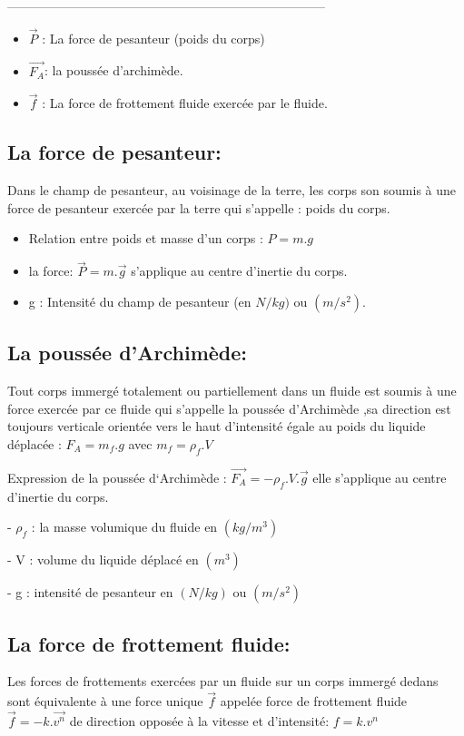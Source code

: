 \documentclass[12pt]{article}
\begin{document}
---------------------------------------------------------------------------
\begin{itemize}
	\item $\vec{P}$ : La force de pesanteur (poids du corps)
	\item $\vec{F_A}$: la poussée d'archimède.
	\item $\vec{f}$ : La force de frottement fluide exercée par le fluide. 
\end{itemize}

\subsection{La force de pesanteur: }
Dans le champ de pesanteur, au voisinage de la terre, les corps son soumis à une force de pesanteur exercée par la terre qui s'appelle : poids du corps.

\begin{itemize}
	\item Relation entre poids et masse d’un corps : $P = m.g$
		\item la force: $\vec{P} = m.\vec{g}$ s'applique au centre d'inertie du corps.

		\item g : Intensité du champ de pesanteur (en $ N/kg)$ ou $(m/s^2)$.

\end{itemize}
\subsection{La poussée d'Archimède:}
Tout corps immergé totalement ou partiellement dans un fluide est soumis à une force exercée par ce fluide qui
s'appelle la poussée d'Archimède ,sa direction est toujours verticale orientée vers le haut d'intensité égale au poids
du liquide déplacée : $F_A = m_f.g$ avec $m_f = \rho_f.V$

Expression de la poussée d‘Archimède : $\vec{F_A} = - \rho_f.V.\vec{g}$ elle s'applique au centre d'inertie du corps.

- $\rho_f$ : la masse volumique du fluide en $(kg/m^3)$

- V :  volume du liquide déplacé en $(m^3)$

- g : intensité de pesanteur en $(N/kg)$ ou $(m/s^2)$

\subsection{La force de frottement fluide:}
Les forces de frottements exercées par un fluide sur un corps immergé dedans sont équivalente à une force unique $\vec{f}$ appelée force de frottement fluide $\vec{f} = -k.\vec{v^n}$ de direction opposée à la vitesse et d'intensité: $f = k.v^n$
\end{document}
